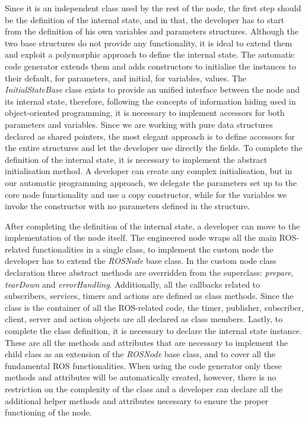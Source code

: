 Since it is an independent class used by the rest of the node, the first step should be the definition of the internal state, and in that, the developer has to start from the definition of his own variables and parameters structures. Although the two base structures do not provide any functionality, it is ideal to extend them and exploit a polymorphic approach to define the internal state. The automatic code generator extends them and adds constructors to initialise the instances to their default, for parameters, and initial, for variables, values. The \textit{InitialStateBase} class exists to provide an unified interface between the node and its internal state, therefore, following the concepts of information hiding used in object-oriented programming, it is necessary to implement accessors for both parameters and variables. Since we are working with pure data structures declared as shared pointers, the most elegant approach is to define accessors for the entire structures and let the developer use directly the fields. To complete the definition of the internal state, it is necessary to implement the abstract initialisation method. A developer can create any complex initialisation, but in our automatic programming approach, we delegate the parameters set up to the core node functionality and use a copy constructor, while for the variables we invoke the constructor with no parameters defined in the structure.

After completing the definition of the internal state, a developer can move to the implementation of the node itself. The engineered node wraps all the main ROS-related functionalities in a single class, to implement the custom node the developer has to extend the \textit{ROSNode} base class. In the custom node class declaration three abstract methods are overridden from the superclass: \textit{prepare}, \textit{tearDown} and \textit{errorHandling}. Additionally, all the callbacks related to subscribers, services, timers and actions are defined as class methods. Since the class is the container of all the ROS-related code, the timer, publisher, subscriber, client, server and action objects are all declared as class members. Lastly, to complete the class definition, it is necessary to declare the internal state instance. These are all the methods and attributes that are necessary to implement the child class as an extension of the \textit{ROSNode} base class, and to cover all the fundamental ROS functionalities. When using the code generator only these methods and attributes will be automatically created, however, there is no restriction on the complexity of the class and a developer can declare all the additional helper methods and attributes necessary to ensure the proper functioning of the node.

